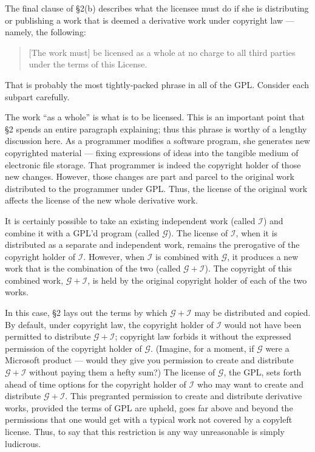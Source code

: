 The final clause of \S 2(b) describes what the licensee must do if she is
distributing or publishing a work that is deemed a derivative work under
copyright law --- namely, the following:
\begin{quote}
[The work must] be licensed as a whole at no charge to all third parties
under the terms of this License.
\end{quote}
That is probably the most tightly-packed phrase in all of the GPL\@.
Consider each subpart carefully.

The work ``as a whole'' is what is to be licensed. This is an important
point that \S 2 spends an entire paragraph explaining; thus this phrase is
worthy of a lengthy discussion here. As a programmer modifies a software
program, she generates new copyrighted material --- fixing expressions of
ideas into the tangible medium of electronic file storage. That
programmer is indeed the copyright holder of those new changes. However,
those changes are part and parcel to the original work distributed to
the programmer under GPL\@. Thus, the license of the original work
affects the license of the new whole derivative work.

\newcommand{\gplusi}{$\mathcal{G\!\!+\!\!I}$}
\newcommand{\worki}{$\mathcal{I}$}
\newcommand{\workg}{$\mathcal{G}$}

\label{separate-and-independent}

It is certainly possible to take an existing independent work (called
\worki{}) and combine it with a GPL'd program (called \workg{}). The
license of \worki{}, when it is distributed as a separate and independent
work, remains the prerogative of the copyright holder of \worki{}.
However, when \worki{} is combined with \workg{}, it produces a new work
that is the combination of the two (called \gplusi{}). The copyright of
this combined work, \gplusi{}, is held by the original copyright
holder of each of the two works.

In this case, \S 2 lays out the terms by which \gplusi{} may be
distributed and copied. By default, under copyright law, the copyright
holder of \worki{} would not have been permitted to distribute \gplusi{};
copyright law forbids it without the expressed permission of the copyright
holder of \workg{}. (Imagine, for a moment, if \workg{} were a Microsoft
product --- would they give you permission to create and distribute
\gplusi{} without paying them a hefty sum?)  The license of \workg{}, the
GPL, sets forth ahead of time options for the copyright holder of \worki{}
who may want to create and distribute \gplusi{}. This pregranted
permission to create and distribute derivative works, provided the terms
of GPL are upheld, goes far above and beyond the permissions that one
would get with a typical work not covered by a copyleft license. Thus, to
say that this restriction is any way unreasonable is simply ludicrous.

